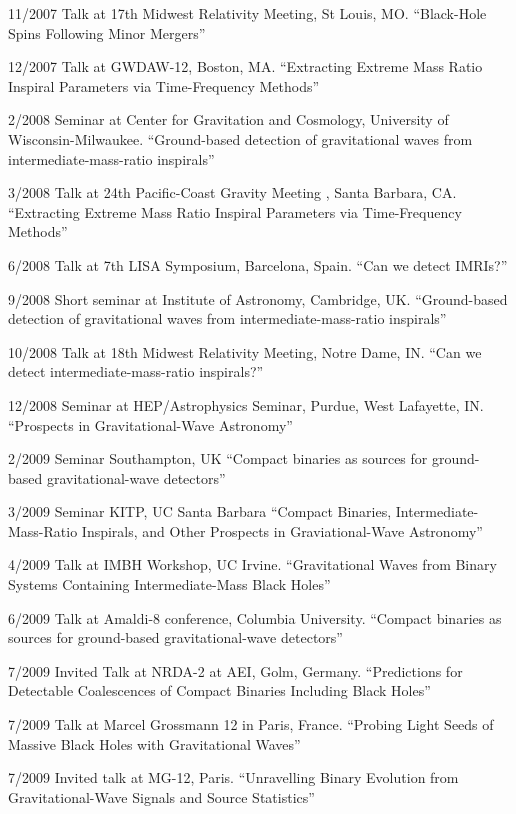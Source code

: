 \documentclass[margin,line]{res}
\begin{document}
\begin{resume}
11/2007 	Talk 	at 17th Midwest Relativity Meeting, St Louis, MO. 	``Black-Hole Spins Following Minor Mergers''

12/2007 	Talk 	at GWDAW-12, Boston, MA. 	``Extracting Extreme Mass Ratio Inspiral Parameters via Time-Frequency Methods''

2/2008 	Seminar at Center for Gravitation and Cosmology, University of Wisconsin-Milwaukee. 	``Ground-based detection of gravitational waves from intermediate-mass-ratio inspirals''

3/2008 	Talk at 24th Pacific-Coast Gravity Meeting , Santa Barbara, CA. 	``Extracting Extreme Mass Ratio Inspiral Parameters via Time-Frequency Methods''

6/2008 	Talk at 7th LISA Symposium, Barcelona, Spain. 	``Can we detect IMRIs?''

9/2008 	Short seminar  at Institute of Astronomy, Cambridge, UK. 	``Ground-based detection of gravitational waves from intermediate-mass-ratio inspirals'' 

10/2008 	Talk 	at 18th Midwest Relativity Meeting, Notre Dame, IN. 	``Can we detect intermediate-mass-ratio inspirals?''

12/2008 	Seminar at HEP/Astrophysics Seminar, Purdue, West Lafayette, IN. 	``Prospects in Gravitational-Wave Astronomy'' 


2/2009 	Seminar 	Southampton, UK 	``Compact binaries as sources for ground-based gravitational-wave detectors''

3/2009 	Seminar 	KITP, UC Santa Barbara 	``Compact Binaries, Intermediate-Mass-Ratio Inspirals, and Other Prospects in Graviational-Wave Astronomy''

4/2009 	Talk 	at IMBH Workshop, UC Irvine. 	``Gravitational Waves from Binary Systems Containing Intermediate-Mass Black Holes'' 

6/2009	Talk at Amaldi-8 conference, Columbia University. ``Compact binaries as sources for ground-based gravitational-wave detectors''

7/2009	Invited Talk at NRDA-2 at AEI, Golm, Germany. ``Predictions for Detectable Coalescences of Compact Binaries Including Black Holes''

7/2009	Talk at Marcel Grossmann 12 in Paris, France.  ``Probing Light Seeds of Massive Black Holes with Gravitational Waves'' 

7/2009	Invited talk at MG-12, Paris.  ``Unravelling Binary Evolution from Gravitational-Wave Signals and Source Statistics''


\end{resume}
\end{document}
